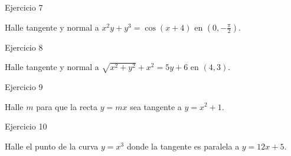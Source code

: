 \documentclass[aspectratio=169]{beamer}
\begin{document}
\begin{frame}{Ejercicio 7}
  \begin{mwejercicio}
    Halle tangente y normal a $x^2 y + y^3 = \cos(x+4)$ en $\left(0, -\frac{\pi}{2}\right)$.
  \end{mwejercicio}
\end{frame}

\begin{frame}{Ejercicio 8}
  \begin{mwejercicio}
    Halle tangente y normal a $\sqrt{x^2+y^2} + x^2 = 5y + 6$ en $(4, 3)$.
  \end{mwejercicio}
\end{frame}

\begin{frame}{Ejercicio 9}
  \begin{mwejercicio}
    Halle $m$ para que la recta $y = mx$ sea tangente a $y = x^2 + 1$.
  \end{mwejercicio}
\end{frame}

\begin{frame}{Ejercicio 10}
  \begin{mwejercicio}
    Halle el punto de la curva $y = x^3$ donde la tangente es paralela a $y = 12x + 5$.
  \end{mwejercicio}
\end{frame}
\end{document}
